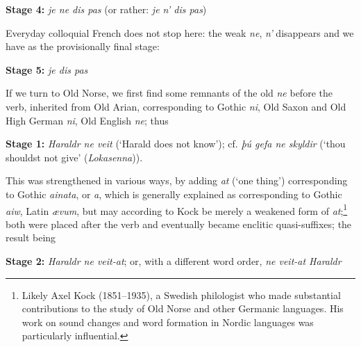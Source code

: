 \bigskip

\textbf{Stage 4:} \textit{je ne dis pas} (or rather: \textit{je n' dis pas})

\bigskip

Everyday colloquial French does not stop here: the weak
\textit{ne}, \textit{n'} disappears and we have as the provisionally final stage:

\bigskip

\textbf{Stage 5:} \textit{je dis pas}

\bigskip

If we turn to Old Norse, we first find some remnants of the old \textit{ne} before the verb, inherited from Old Arian, corresponding to Gothic \textit{ni}, Old Saxon and Old High German \textit{ni}, Old English \textit{ne}; thus

\bigskip


\textbf{Stage 1:} \textit{Haraldr ne veit} (`Harald does not know'); cf. \textit{þú gefa ne skyldir} (`thou shouldst not give' (\textit{Lokasenna})).

\bigskip

This was strengthened in various ways, by adding \textit{at} (`one thing') corresponding to Gothic \textit{ainata}, or \textit{a}, which is generally explained as corresponding to Gothic \textit{aiw}, Latin \textit{ævum}, but may according to Kock %
be merely a weakened form of \textit{at};\footnote{Likely Axel Kock (1851--1935), a Swedish philologist who made substantial contributions to the study of Old Norse and other Germanic languages. His work on sound changes and word formation in Nordic languages was particularly influential. \eds} both were placed after the verb and eventually became enclitic quasi-suffixes; the result being

\bigskip

\textbf{Stage 2:} \textit{Haraldr ne veit-at}; or, with a different word order, \textit{ne veit-at Haraldr}

